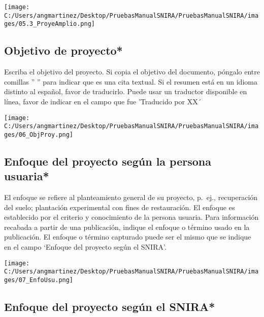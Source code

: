 \documentclass[
]{book}
\begin{document}
\texttt{[image: C:/Users/angmartinez/Desktop/PruebasManualSNIRA/PruebasManualSNIRA/images/05.3\_ProyeAmplio.png]}

\hypertarget{objetivo-de-proyecto}{%
\subsection{Objetivo de proyecto*}\label{objetivo-de-proyecto}}

Escriba el objetivo del proyecto.
Si copia el objetivo del documento, póngalo entre comillas '' '' para indicar que es una cita textual.
Si el resumen está en un idioma distinto al español, favor de traducirlo.
Puede usar un traductor disponible en línea, favor de indicar en el campo que fue 'Traducido por XX´

\texttt{[image: C:/Users/angmartinez/Desktop/PruebasManualSNIRA/PruebasManualSNIRA/images/06\_ObjProy.png]}

\hypertarget{enfoque-del-proyecto-seguxfan-la-persona-usuaria}{%
\subsection{Enfoque del proyecto según la persona usuaria*}\label{enfoque-del-proyecto-seguxfan-la-persona-usuaria}}

El enfoque se refiere al planteamiento general de su proyecto, p.~ej., recuperación del suelo; plantación experimental con fines de restauración.
El enfoque es establecido por el criterio y conocimiento de la persona usuaria.
Para información recabada a partir de una publicación, indique el enfoque o término usado en la publicación.
El enfoque o término capturado puede ser el mismo que se indique en el campo `Enfoque del proyecto según el SNIRA'.

\texttt{[image: C:/Users/angmartinez/Desktop/PruebasManualSNIRA/PruebasManualSNIRA/images/07\_EnfoUsu.png]}

\hypertarget{enfoque-del-proyecto-seguxfan-el-snira}{%
\subsection{Enfoque del proyecto según el SNIRA*}\label{enfoque-del-proyecto-seguxfan-el-snira}}
\end{document}
